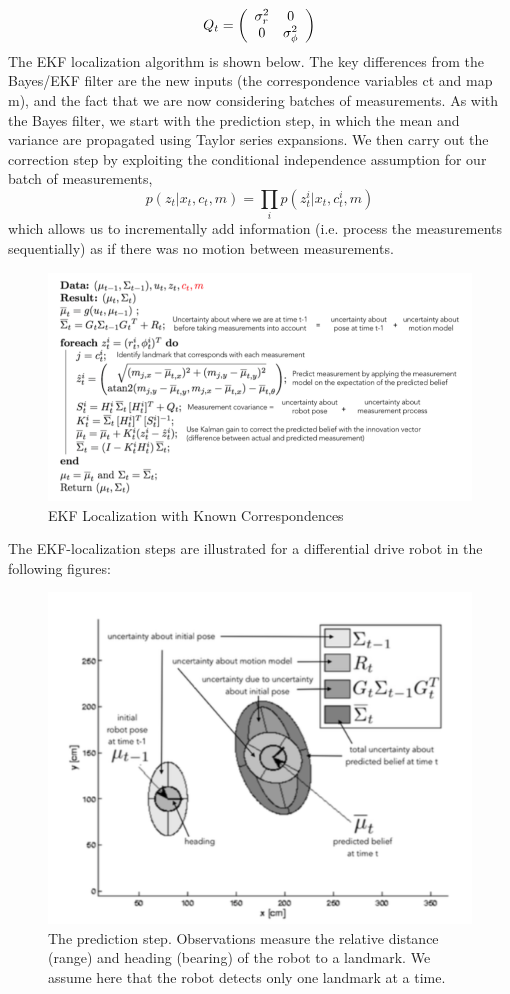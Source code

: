 \documentclass[twoside]{article}
\begin{document}
\begin{equation}
    Q _ { t } = \left( \begin{array} { c c } { \sigma _ { r } ^ { 2 } } & { 0 } \\ { 0 } & { \sigma _ { \phi } ^ { 2 } } \end{array} \right)
\end{equation}
The EKF localization algorithm is shown below. The key differences from the Bayes/EKF filter are the new
inputs (the correspondence variables ct and map m), and the fact that we are now considering batches of
measurements. As with the Bayes filter, we start with the prediction step, in which the mean and variance
are propagated using Taylor series expansions. We then carry out the correction step by exploiting the
conditional independence assumption for our batch of measurements,
\begin{equation}
    p \left( z _ { t } | x _ { t } , c _ { t } , m \right) = \prod _ { i } p \left( z _ { t } ^ { i } | x _ { t } , c _ { t } ^ { i } , m \right)
\end{equation}
which allows us to incrementally add information (i.e. process the measurements sequentially) as if there
was no motion between measurements.
\begin{figure}[H]
\centering
\includegraphics[width=.7\linewidth]{EKFLocalization.png}
\caption{EKF Localization with Known Correspondences}
\label{fig:EKFLocalization}
\end{figure}
The EKF-localization steps are illustrated for a differential drive robot in the following figures:
\begin{figure}[H]
\centering
\includegraphics[width=.7\linewidth]{PredictionStep.png}
\caption{The prediction step. Observations measure the relative distance (range) and heading (bearing) of the robot to a landmark. We assume here that the robot detects only one landmark at a time.}
\label{fig:PredictionStep}
\end{figure}
\end{document}
